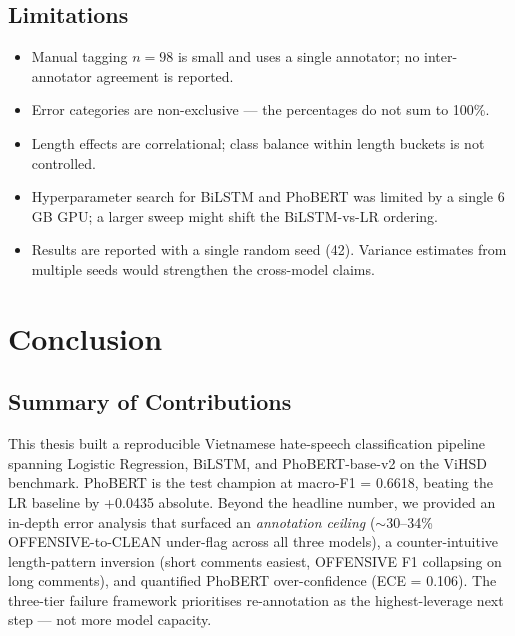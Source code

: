 \documentclass[a4paper,12pt,oneside]{report}
\begin{document}
\section{Limitations}
\begin{itemize}
  \item Manual tagging $n = 98$ is small and uses a single annotator;
        no inter-annotator agreement is reported.
  \item Error categories are non-exclusive --- the percentages do not
        sum to 100\%.
  \item Length effects are correlational; class balance within length
        buckets is not controlled.
  \item Hyperparameter search for BiLSTM and PhoBERT was limited by
        a single 6\,GB GPU; a larger sweep might shift the
        BiLSTM-vs-LR ordering.
  \item Results are reported with a single random seed (42). Variance
        estimates from multiple seeds would strengthen the
        cross-model claims.
\end{itemize}

\chapter{Conclusion}
\label{ch:conclusion}

\section{Summary of Contributions}
This thesis built a reproducible Vietnamese hate-speech classification
pipeline spanning Logistic Regression, BiLSTM, and PhoBERT-base-v2 on
the ViHSD benchmark. PhoBERT is the test champion at macro-F1 = 0.6618,
beating the LR baseline by +0.0435 absolute. Beyond the headline number,
we provided an in-depth error analysis that surfaced an
\emph{annotation ceiling} ($\sim$30--34\% OFFENSIVE-to-CLEAN under-flag
across all three models), a counter-intuitive length-pattern inversion
(short comments easiest, OFFENSIVE F1 collapsing on long comments),
and quantified PhoBERT over-confidence (ECE = 0.106). The
three-tier failure framework prioritises re-annotation as the
highest-leverage next step --- not more model capacity.
\end{document}
